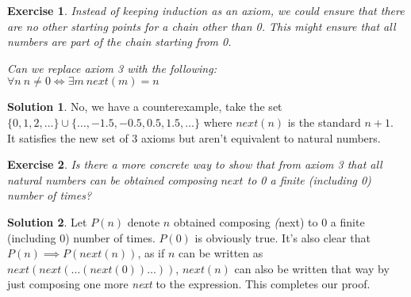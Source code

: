 \documentclass[a4paper,10pt]{article}
\newtheorem{exercise}{Exercise}[section]
\theoremstyle{definition} %
\newtheorem*{solution}{Solution}
\begin{document}
    \begin{exercise}
        Instead of keeping induction as an axiom, we could ensure that there are no other
        starting points for a chain other than 0. This might ensure that all numbers are
        part of the chain starting from 0. 

        Can we replace axiom 3 with the following: \\ 
        $\forall n \ n \neq 0 \iff \exists m \ next(m) = n$
    \end{exercise}
    \begin{solution}
        No, we have a counterexample, take the set \\ 
        $\{0, 1, 2, \dots\} \cup \{\dots, -1.5, -0.5, 0.5, 1.5, \dots\}$ where $next(n)$ is the standard $n+1$. \\
        It satisfies the new set of 3 axioms but aren't equivalent to natural numbers.
    \end{solution}

    \begin{exercise}
        Is there a more concrete way to show that from axiom 3 that all natural numbers
        can be obtained composing $next$ to 0 a finite (including 0) number of times?
    \end{exercise}
    \begin{solution}
        Let $P(n)$ denote $n$ obtained composing \emph(next) to 0 a finite (including 0) 
        number of times. $P(0)$ is obviously true. It's also clear that $P(n) \implies P(next(n))$,
        as if $n$ can be written as $next(next(\dots(next(0))\dots))$, $next(n)$ can also be written
        that way by just composing one more \emph{next} to the expression. 
        This completes our proof.
    \end{solution}
\end{document}
